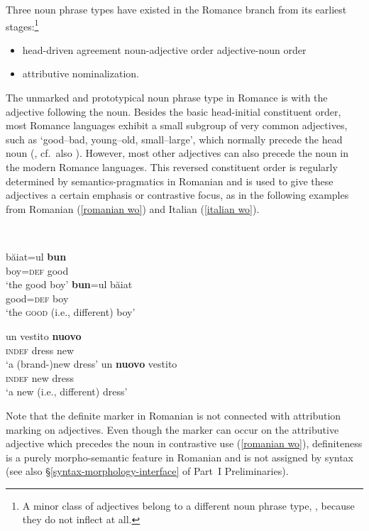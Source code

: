 Three noun phrase types have existed in the Romance branch from its earliest stages:\footnote{A minor class of adjectives belong to a different noun phrase type, 
, because they do not inflect at all.}
\begin{itemize}
\item head\hyp{}driven agreement
	\subitem noun-adjective order
	\subitem adjective-noun order
\item attributive nominalization.
\end{itemize}
The unmarked and prototypical noun phrase type in Romance is  with the adjective following the noun. Besides the basic head-initial constituent order, most Romance languages exhibit a small subgroup of very common adjectives, such as ‘good–bad, young–old, small–large’, which normally precede the head noun (\citealt[146–147]{posner1996}, cf.~also \citealt[340]{silvestri1998}). However, most other adjectives can also precede the noun in the modern Romance languages. This reversed constituent order is regularly determined by semantics-pragmatics in Romanian and is used to give these adjectives a certain emphasis or contrastive focus, as in the following examples from Romanian (\ref{romanian wo}) and Italian (\ref{italian wo}).
\begin{exe}
\ex
\begin{xlist} 
\\
\label{romanian wo} 
\begin{xlist}
\ex	
\gll	băiat=ul \textbf{bun}\\
	boy=\textsc{def} good\\
\glt	‘the good boy’
\ex	
\gll	\textbf{bun}=ul băiat\\
	good=\textsc{def} boy\\
\glt	‘the \textsc{good} (i.e., different) boy’ 
\end{xlist}
\label{italian wo}
\begin{xlist}
\ex	
\gll	un vestito \textbf{nuovo}\\
	\textsc{indef} dress new\\
\glt	‘a (brand-)new dress’
\ex	
\gll	un \textbf{nuovo} vestito\\
	\textsc{indef} new dress\\
\glt	‘a new (i.e., different) dress’
\end{xlist}
\end{xlist}
\end{exe}
Note that the definite marker in Romanian is not connected with attribution marking on adjectives. Even though the marker can occur on the attributive adjective which precedes the noun in contrastive use (\ref{romanian wo}), definiteness is a purely morpho-semantic feature in Romanian and is not assigned by syntax (see also \S\ref{syntax-morphology-interface} of Part~I Preliminaries).

